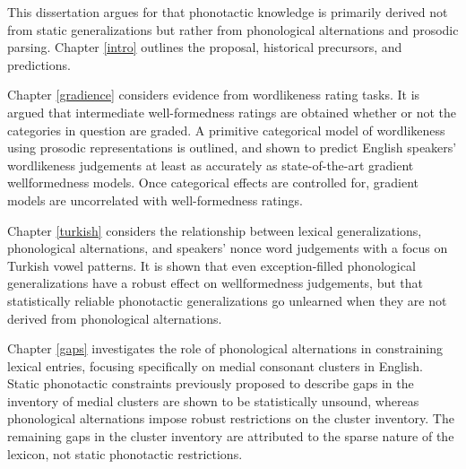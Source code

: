This dissertation argues for that phonotactic knowledge is primarily derived not from static generalizations but rather from phonological alternations and prosodic parsing. Chapter \ref{intro} outlines the proposal, historical precursors, and predictions. 

Chapter \ref{gradience} considers evidence from wordlikeness rating tasks. It is argued that intermediate well-formedness ratings are obtained whether or not the categories in question are graded. A primitive categorical model of wordlikeness using prosodic representations is outlined, and shown to predict English speakers' wordlikeness judgements at least as accurately as state-of-the-art gradient wellformedness models. Once categorical effects are controlled for, gradient models are uncorrelated with well-formedness ratings.

Chapter \ref{turkish} considers the relationship between lexical generalizations, phonological alternations, and speakers' nonce word judgements with a focus on Turkish vowel patterns. It is shown that even exception-filled phonological generalizations have a robust effect on wellformedness judgements, but that statistically reliable phonotactic generalizations go unlearned when they are not derived from phonological alternations.

Chapter \ref{gaps} investigates the role of phonological alternations in constraining lexical entries, focusing specifically on medial consonant clusters in English. Static phonotactic constraints previously proposed to describe gaps in the inventory of medial clusters are shown to be statistically unsound, whereas phonological alternations impose robust restrictions on the cluster inventory. The remaining gaps in the cluster inventory are attributed to the sparse nature of the lexicon, not static phonotactic restrictions.
